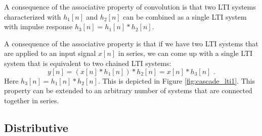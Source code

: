 \begin{marginfigure}
\begin{center}
\end{center}
\caption{A consequence of the associative property of convolution is
  that two LTI systems characterized with $h_1[n]$ and $h_2[n]$ can be
  combined as a single LTI system with impulse response
  $h_3[n]=h_1[n]*h_2[n]$.}
\label{fig:cascade_lti1}
\end{marginfigure}

A consequence of the associative property is that if we have two LTI
systems that are applied to an input signal $x[n]$ in series, we can
come up with a single LTI system that is equivalent to two  chained LTI systems:
\begin{equation}
  y[n] = (x[n]*h_1[n])*h_2[n] = x[n]*h_3[n]\,\,.
\end{equation}
Here $h_3[n]=h_1[n]*h_2[n]$. This is depicted in Figure
\ref{fig:cascade_lti1}. This property can be extended to an arbitrary
number of systems that are connected together in series.

\subsection{Distributive}


